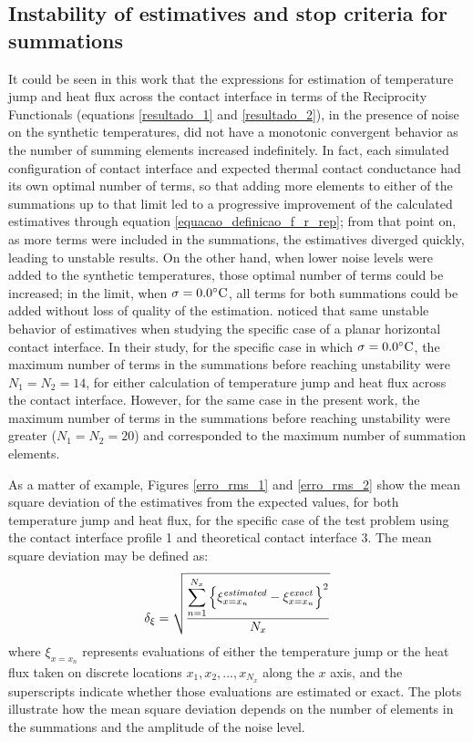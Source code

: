 \documentclass[12pt]{CHT-20}
\begin{document}
\subsection*{Instability of estimatives and stop criteria for summations}
It could be seen in this work that the expressions for estimation of temperature jump and heat flux across the contact interface in terms of the Reciprocity Functionals (equations \eqref{resultado_1} and \eqref{resultado_2}), in the presence of noise on the synthetic temperatures, did not have a monotonic convergent behavior as the number of summing elements increased indefinitely. In fact, each simulated configuration of contact interface and expected thermal contact conductance had its own optimal number of terms, so that adding more elements to either of the summations up to that limit led to a progressive improvement of the calculated estimatives through equation \eqref{equacao_definicao_f_r_rep}; from that point on, as more terms were included in the summations, the estimatives diverged quickly, leading to unstable results. On the other hand, when lower noise levels were added to the synthetic temperatures, those optimal number of terms could be increased; in the limit, when $\sigma = 0.0\celsius$, all terms for both summations could be added without loss of quality of the estimation. \cite{artigo_padilha_3} noticed that same unstable behavior of estimatives when studying the specific case of a planar horizontal contact interface. In their study, for the specific case in which $\sigma = 0.0\celsius$, the maximum number of terms in the summations before reaching unstability were $N_1=N_2=14$, for either calculation of temperature jump and heat flux across the contact interface. However, for the same case in the present work, the maximum number of terms in the summations before reaching unstability were greater ($N_1=N_2=20$) and corresponded to the maximum number of summation elements.

As a matter of example, Figures \ref{erro_rms_1} and \ref{erro_rms_2} show the mean square deviation of the estimatives from the expected values, for both temperature jump and heat flux, for the specific case of the test problem using the contact interface profile 1 and theoretical contact interface 3. The mean square deviation may be defined as:
\begin{equation}
\delta_{\xi} = \sqrt{\frac{\displaystyle\sum_{n=1}^{N_x}\left\lbrace \xi_{x=x_n}^\text{\textit{estimated}} - \xi_{x=x_n}^\text{\textit{exact}}\right \rbrace^2}{N_x}}
\end{equation}
where $\xi_{x=x_n}$ represents evaluations of either the temperature jump or the heat flux taken on discrete locations $x_1, x_2,..., x_{N_x}$ along the $x$ axis, and the superscripts indicate whether those evaluations are estimated or exact. The plots illustrate how the mean square deviation depends on the number of elements in the summations and the amplitude of the noise level.
\end{document}
